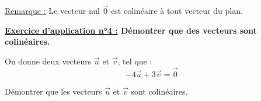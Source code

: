 \documentclass[12pt]{article}
\begin{document}
\vspace{10pt}

\underline{Remarque :} Le vecteur nul $\overrightarrow{0}$ est colinéaire à tout vecteur du plan.

\vspace{10pt}

\begin{mdframed}[
    linewidth=1pt,
    roundcorner=5pt,
    linecolor=RoyalBlue,
    innertopmargin=10pt,
    innerbottommargin=10pt
]
{\color{RoyalBlue}\textbf{\underline{Exercice d'application n°4 :} Démontrer que des vecteurs 
sont colinéaires.}}
\vspace{10pt}

On donne deux vecteurs $\overrightarrow{u}$ et $\overrightarrow{v}$, tel que :
\[
-4\overrightarrow{u} + 3\overrightarrow{v} = \overrightarrow{0}
\]

Démontrer que les vecteurs $\overrightarrow{u}$ et $\overrightarrow{v}$ sont colinéaires.

\end{mdframed}
\end{document}
